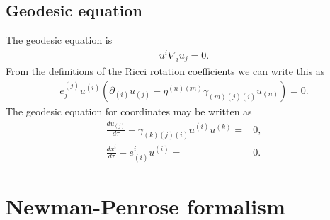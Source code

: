 \documentclass[12pt]{report}
\begin{document}
\subsection{Geodesic equation}
	The geodesic equation is
\begin{align}
	u^i\nabla_iu_j=0
	.
\end{align}
	From the definitions of the Ricci rotation coefficients we can write
this as
\begin{align}
	e^{(j)}_ju^{(i)}
	\left(
		\partial_{(i)}u_{(j)}
	-	\eta^{(n)(m)}\gamma_{(m)(j)(i)}u_{(n)}
	\right)
	=
	0
	.
\end{align}
	The geodesic equation for coordinates may be written as
\begin{subequations}
\begin{align}
	\frac{du_{(j)}}{d\tau}
-	\gamma_{(k)(j)(i)}u^{(i)}u^{(k)}
	= &
	0
	, \\
	\frac{dx^i}{d\tau} - e^i_{(i)}u^{(i)} 
	= &
	0
	.
\end{align}
\end{subequations}
\section{Newman-Penrose formalism}
\label{sec:np_formalism}
\end{document}
